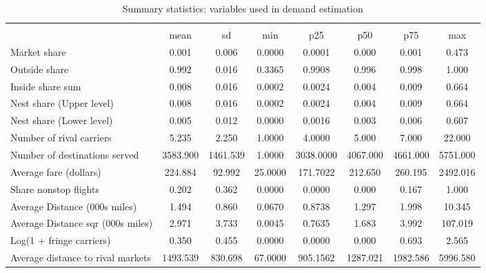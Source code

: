 \begin{table}[htbp]\centering
\def\sym#1{\ifmmode^{#1}\else\(^{#1}\)\fi}
\caption{Summary statistics: variables used in demand estimation}
\begin{tabular}{l*{1}{ccccccc}}
\toprule
                    &\multicolumn{7}{c}{}                                                                      \\
                    &        mean&          sd&         min&         p25&         p50&         p75&         max\\
\midrule
Market share        &       0.001&       0.006&      0.0000&      0.0001&       0.000&       0.001&       0.473\\
Outside share       &       0.992&       0.016&      0.3365&      0.9908&       0.996&       0.998&       1.000\\
Inside share sum    &       0.008&       0.016&      0.0002&      0.0024&       0.004&       0.009&       0.664\\
Nest share (Upper level)&       0.008&       0.016&      0.0002&      0.0024&       0.004&       0.009&       0.664\\
Nest share (Lower level)&       0.005&       0.012&      0.0000&      0.0016&       0.003&       0.006&       0.607\\
Number of rival carriers&       5.235&       2.250&      1.0000&      4.0000&       5.000&       7.000&      22.000\\
Number of destinations served&    3583.900&    1461.539&      1.0000&   3038.0000&    4067.000&    4661.000&    5751.000\\
Average fare (dollars)&     224.884&      92.992&     25.0000&    171.7022&     212.650&     260.195&    2492.016\\
Share nonstop flights &       0.202&       0.362&      0.0000&      0.0000&       0.000&       0.167&       1.000\\
Average Distance (000s miles)&       1.494&       0.860&      0.0670&      0.8738&       1.297&       1.998&      10.345\\
Average Distance sqr (000s miles)&       2.971&       3.733&      0.0045&      0.7635&       1.683&       3.992&     107.019\\
Log(1 + fringe carriers)&       0.350&       0.455&      0.0000&      0.0000&       0.000&       0.693&       2.565\\
Average distance to rival markets&    1493.539&     830.698&     67.0000&    905.1562&    1287.021&    1982.586&    5996.580\\

\end{tabular}
\end{table}
